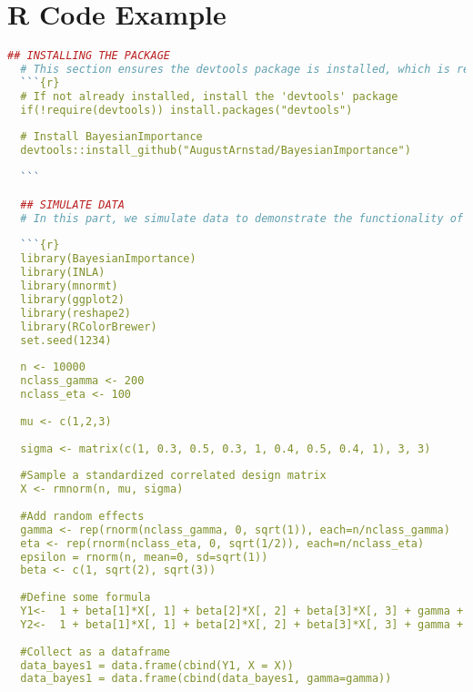 \section*{R Code Example}
\begin{lstlisting}[language=R, caption=Usage of the Bayesian Importance package with plots and examples.]
  ## INSTALLING THE PACKAGE
  # This section ensures the devtools package is installed, which is required for installing packages from GitHub. We then install the BayesianImportance package directly from GitHub using devtools::install_github(). In the package under the Hello.R file, all functions are defined with corresponding documentation.
  ```{r}
  # If not already installed, install the 'devtools' package
  if(!require(devtools)) install.packages("devtools")
  
  # Install BayesianImportance
  devtools::install_github("AugustArnstad/BayesianImportance")
  
  ```
  
  ## SIMULATE DATA
  # In this part, we simulate data to demonstrate the functionality of the BayesianImportance package. We generate random variables with different correlation structures, random effects, and an error term. The data is then structured into data frames for further analysis. If you have a suitable dataset you can use this instead.
  
  ```{r}
  library(BayesianImportance)
  library(INLA)
  library(mnormt)
  library(ggplot2)
  library(reshape2)
  library(RColorBrewer)
  set.seed(1234)
  
  n <- 10000
  nclass_gamma <- 200
  nclass_eta <- 100
  
  mu <- c(1,2,3)
  
  sigma <- matrix(c(1, 0.3, 0.5, 0.3, 1, 0.4, 0.5, 0.4, 1), 3, 3)
  
  #Sample a standardized correlated design matrix
  X <- rmnorm(n, mu, sigma)
  
  #Add random effects
  gamma <- rep(rnorm(nclass_gamma, 0, sqrt(1)), each=n/nclass_gamma)
  eta <- rep(rnorm(nclass_eta, 0, sqrt(1/2)), each=n/nclass_eta)
  epsilon = rnorm(n, mean=0, sd=sqrt(1))
  beta <- c(1, sqrt(2), sqrt(3))
  
  #Define some formula
  Y1<-  1 + beta[1]*X[, 1] + beta[2]*X[, 2] + beta[3]*X[, 3] + gamma + epsilon # + eta
  Y2<-  1 + beta[1]*X[, 1] + beta[2]*X[, 2] + beta[3]*X[, 3] + gamma + eta + epsilon
  
  #Collect as a dataframe
  data_bayes1 = data.frame(cbind(Y1, X = X))
  data_bayes1 = data.frame(cbind(data_bayes1, gamma=gamma)) 
  

\end{lstlisting}
